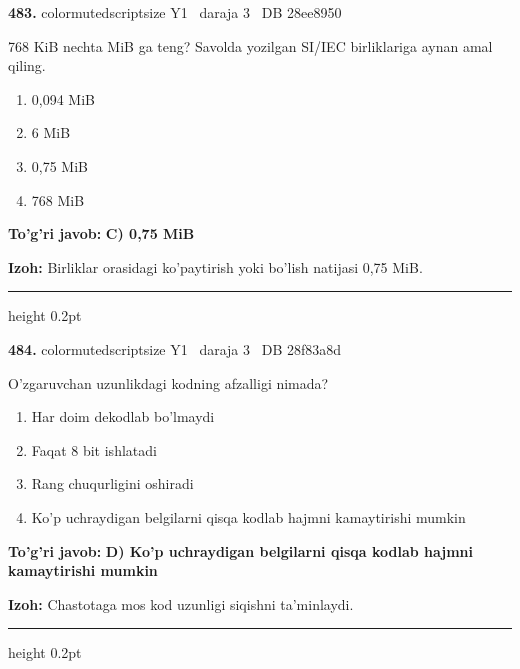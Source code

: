 \documentclass[10pt,a4paper,oneside]{article}
\begin{document}
\noindent\textbf{\color{ink}483.}  {color{muted}scriptsize Y1 \textbullet\ daraja 3 \textbullet\ DB 28ee8950}
\par
768 KiB nechta MiB ga teng? Savolda yozilgan SI/IEC birliklariga aynan amal qiling.
\begin{enumerate}[label=\Alph*),leftmargin=9mm]
\item 0,094 MiB
\item 6 MiB
\item 0,75 MiB
\item 768 MiB
\end{enumerate}
\begin{tcolorbox}[enhanced,breakable,colback=teal!4,colframe=teal!50!black,boxrule=0.5pt,arc=1.1mm,left=3mm,right=3mm,top=1.7mm,bottom=1.7mm,before skip=2mm,after skip=2mm]
\textbf{\color{teal}To'g'ri javob:} \textbf{C) 0,75 MiB}
\par\smallskip
\textbf{Izoh:} Birliklar orasidagi ko'paytirish yoki bo'lish natijasi 0,75 MiB.
\end{tcolorbox}
\vspace{2mm}\hrule height 0.2pt \vspace{3mm}

\noindent\textbf{\color{ink}484.}  {color{muted}scriptsize Y1 \textbullet\ daraja 3 \textbullet\ DB 28f83a8d}
\par
O'zgaruvchan uzunlikdagi kodning afzalligi nimada?
\begin{enumerate}[label=\Alph*),leftmargin=9mm]
\item Har doim dekodlab bo'lmaydi
\item Faqat 8 bit ishlatadi
\item Rang chuqurligini oshiradi
\item Ko'p uchraydigan belgilarni qisqa kodlab hajmni kamaytirishi mumkin
\end{enumerate}
\begin{tcolorbox}[enhanced,breakable,colback=teal!4,colframe=teal!50!black,boxrule=0.5pt,arc=1.1mm,left=3mm,right=3mm,top=1.7mm,bottom=1.7mm,before skip=2mm,after skip=2mm]
\textbf{\color{teal}To'g'ri javob:} \textbf{D) Ko'p uchraydigan belgilarni qisqa kodlab hajmni kamaytirishi mumkin}
\par\smallskip
\textbf{Izoh:} Chastotaga mos kod uzunligi siqishni ta'minlaydi.
\end{tcolorbox}
\vspace{2mm}\hrule height 0.2pt \vspace{3mm}
\end{document}
